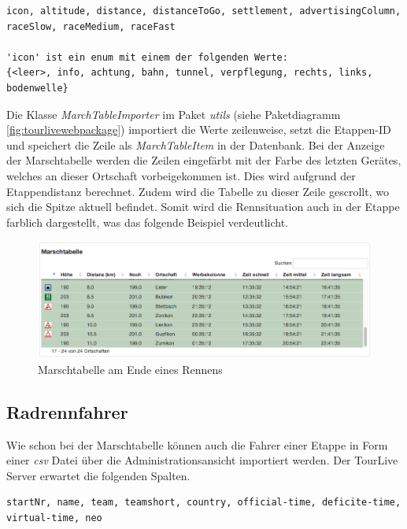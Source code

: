 \begin{lstlisting}[caption=Marschtabellen CSV Import, label=code:marchtableimport]
icon, altitude, distance, distanceToGo, settlement, advertisingColumn, raceSlow, raceMedium, raceFast

'icon' ist ein enum mit einem der folgenden Werte:
{<leer>, info, achtung, bahn, tunnel, verpflegung, rechts, links, bodenwelle}
\end{lstlisting}

Die Klasse \textit{MarchTableImporter} im Paket \textit{utils} (siehe Paketdiagramm \ref{fig:tourlivewebpackage}) importiert die Werte zeilenweise, setzt die Etappen-ID und speichert die Zeile als \textit{MarchTableItem} in der Datenbank. Bei der Anzeige der Marschtabelle werden die Zeilen eingefärbt mit der Farbe des letzten Gerätes, welches an dieser Ortschaft vorbeigekommen ist. Dies wird aufgrund der Etappendistanz berechnet. Zudem wird die Tabelle zu dieser Zeile gescrollt, wo sich die Spitze aktuell befindet. Somit wird die Rennsituation auch in der Etappe farblich dargestellt, was das folgende Beispiel verdeutlicht.

\begin{figure}[H]
	\centering
	\includegraphics[width=130mm]{images/tourliveweb/marschtabelle.png}
	\caption{Marschtabelle am Ende eines Rennens}
\end{figure}

\subsection{Radrennfahrer}
Wie schon bei der Marschtabelle können auch die Fahrer einer Etappe in Form einer \textit{\gls{csv}} Datei über die Administrationsansicht importiert werden. Der TourLive Server erwartet die folgenden Spalten.

\begin{lstlisting}[caption=Fahrerliste CSV Import, label=code:riderimport]
startNr, name, team, teamshort, country, official-time, deficite-time, virtual-time, neo
\end{lstlisting}

